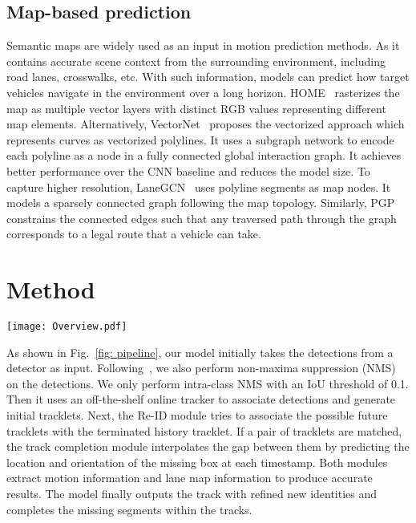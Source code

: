 \documentclass{article} \usepackage{iclr2023_conference,times}
\begin{document}
\subsection{Map-based prediction}
\vspace{-1mm}
Semantic maps are widely used as an input in motion prediction methods. As it contains accurate scene context from the surrounding environment, including road lanes, crosswalks, etc. With such information, models can predict how target vehicles navigate in the environment over a long horizon. HOME~\cite{ HOME} rasterizes the map as multiple vector layers with distinct RGB values representing different map elements. Alternatively, VectorNet~\cite{gao2020vectornet} proposes the vectorized approach which represents curves as vectorized polylines. It uses a subgraph network to encode each polyline as a node in a fully connected global interaction graph. It achieves better performance over the CNN baseline and reduces the model size. To capture higher resolution, LaneGCN~\cite{laneGCN} uses polyline segments as map nodes. It models a sparsely connected graph following the map topology. Similarly, PGP~\cite{PGP} constrains the connected edges such that any traversed path through the graph corresponds to a legal route that a vehicle can take. 


\vspace{-1mm}
\section{Method}
\label{headings}
\vspace{-1mm}

\begin{figure*}[ht]
    \centering
    \texttt{[image: Overview.pdf]}
    \caption{A brief overview of the offline tracking model. 
    \textbf{(a) Online tracking result}: 
    Each tracklet is represented by a different color (the history tracklet is red). 
    \textbf{(b) Offline Re-ID }: 
    The matched pair of tracklets are red. The unmatched ones are black. 
    \textbf{(c) Recovered trajectory }.
    }
    \label{fig: pipeline}
\end{figure*}
As shown in Fig.~\ref{fig: pipeline}, our model initially takes the detections from a detector as input. Following~\cite{Immortaltrackers}, we also perform non-maxima suppression (NMS) on the detections. We only perform intra-class NMS with an IoU threshold of 0.1. Then it uses an off-the-shelf online tracker to associate detections and generate initial tracklets. Next, the Re-ID module tries to associate the possible future tracklets with the terminated history tracklet. If a pair of tracklets are matched, the track completion module interpolates the gap between them by predicting the location and orientation of the missing box at each timestamp. Both modules extract motion information and lane map information to produce accurate results. The model finally outputs the track with refined new identities and completes the missing segments within the tracks. 
\end{document}
